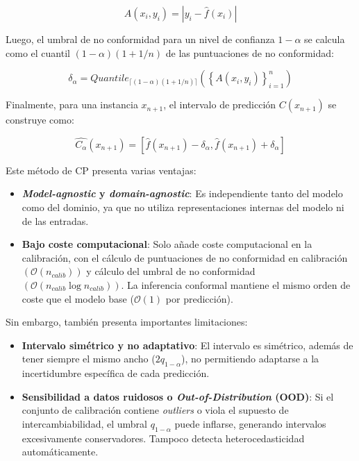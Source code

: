 $$
A(x_i, y_i) = | y_i - \hat{f}(x_i) |
$$

Luego, el umbral de no conformidad para un nivel de confianza $1-\alpha$ se calcula como el cuantil $(1-\alpha)(1+1/n)$ de las puntuaciones de no conformidad:

$$
\delta_\alpha = Quantile_{ \lceil  (1-\alpha) (1 + 1/n)  \rceil } ( \left\{ A(x_i,y_i) \right\}_{i=1}^n )
$$

Finalmente, para una instancia $x_{n+1}$, el intervalo de predicción $C(x_{n+1})$ se construye como: 

$$
\hat{C_\alpha}(x_{n+1}) = \left[ \hat{f}(x_{n+1}) - \delta_\alpha, \hat{f}(x_{n+1}) + \delta_\alpha\right]
$$

Este método de \acrshort{CP} presenta varias ventajas: 

\begin{itemize}

    \item \textbf{\textit{Model-agnostic} y \textit{domain-agnostic}}: Es independiente tanto del modelo como del dominio, ya que no utiliza representaciones internas del modelo ni de las entradas. 
    
    \item \textbf{Bajo coste computacional}: Solo añade coste computacional en la calibración, con el cálculo de puntuaciones de no conformidad en calibración $\left( \mathcal{O}(n_{calib}) \right)$ y cálculo del umbral de no conformidad $\left( \mathcal{O}(n_{calib} \log n_{calib}) \right)$. La inferencia conformal mantiene el mismo orden de coste que el modelo base ($\mathcal{O}(1)$ por predicción). 

\end{itemize}

Sin embargo, también presenta importantes limitaciones: 

\begin{itemize}
    
    \item \textbf{Intervalo simétrico y no adaptativo}: El intervalo es simétrico, además de tener siempre el mismo ancho ($2q_{1-\alpha}$), no permitiendo adaptarse a la incertidumbre específica de cada predicción. 

    \item \textbf{Sensibilidad a datos ruidosos o \textit{Out-of-Distribution} (\acrshort{OOD})}: Si el conjunto de calibración contiene \textit{outliers} o viola el supuesto de intercambiabilidad, el umbral \(q_{1-\alpha}\) puede inflarse, generando intervalos excesivamente conservadores. Tampoco detecta heterocedasticidad automáticamente.

\end{itemize}

